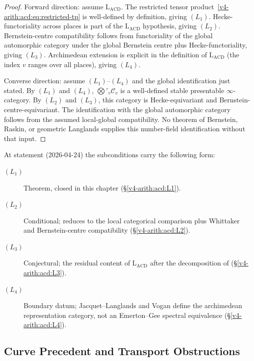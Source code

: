 \begin{proof}
Forward direction: assume \(\mathrm{L}_{\mathrm{ACD}}\). The restricted
tensor product~\eqref{v4-arith:acd:eq:restricted-tp} is well-defined
by definition, giving \((L_{1})\). Hecke-functoriality across places
is part of the \(\mathrm{L}_{\mathrm{ACD}}\) hypothesis, giving
\((L_{2})\). Bernstein-centre compatibility follows from functoriality
of the global automorphic category under the global Bernstein centre
plus Hecke-functoriality, giving \((L_{3})\). Archimedean extension is
explicit in the definition of \(\mathrm{L}_{\mathrm{ACD}}\) (the index
\(v\) ranges over all places), giving \((L_{4})\).

Converse direction: assume \((L_{1})\)--\((L_{4})\) and the global
identification just stated. By \((L_{1})\) and
\((L_{4})\), \(\bigotimes'_{v}\mathcal{C}_{v}\) is a well-defined stable
presentable \(\infty\)-category. By \((L_{2})\) and \((L_{3})\), this
category is Hecke-equivariant and Bernstein-centre-equivariant. The
identification with the global automorphic category follows from
the assumed local-global compatibility. No theorem of Bernstein,
Raskin, or geometric Langlands supplies this number-field
identification without that input.
\end{proof}

\begin{remark}
\label{v4-arith:acd:rem:subcondition-form}
At statement (2026-04-24) the subconditions carry the following
form:
\begin{description}
\item[\((L_{1})\)] Theorem, closed in this chapter
(\S\ref{v4-arith:acd:L1}).
\item[\((L_{2})\)] Conditional; reduces to the local categorical
comparison plus Whittaker and Bernstein-centre compatibility
(\S\ref{v4-arith:acd:L2}).
\item[\((L_{3})\)] Conjectural; the residual content of
\(\mathrm{L}_{\mathrm{ACD}}\) after the decomposition of
(\S\ref{v4-arith:acd:L3}).
\item[\((L_{4})\)] Boundary datum; Jacquet--Langlands and Vogan define
the archimedean representation category, not an Emerton--Gee spectral
equivalence (\S\ref{v4-arith:acd:L4}).
\end{description}
\end{remark}

\subsection{Curve Precedent and Transport Obstructions}
\label{v4-arith:acd:obstruction-2}

